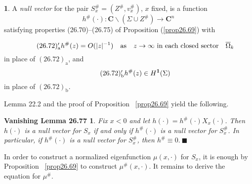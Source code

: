\documentclass{surv-l}
\theoremstyle{plain}
\newtheorem*{vlem}{\sc Vanishing Lemma 26.77}
\theoremstyle{definition}
\newtheorem{definition}[theorem]{\sc{Definition}}
\numberwithin{equation}{chapter}
\begin{document}
\renewcommand\thetheorem{26.\arabic{theorem}}
\setcounter{theorem}{75}
\begin{definition}\label{eq26.76}
A \emph{null vector} for the pair $S_{x}^{\#}=(Z^{\#}, v_{x}^{\#})$, $x$ fixed, is a function
\begin{equation*}
h^{\#}(\cdot):\mathbf{C}\backslash (\Sigma\cup Z^{\#})\rightarrow \mathbf{C}^{n}
\end{equation*}
satisfying properties (26.70)--(26.75) of Proposition (\ref{prop26.69}) with

\begin{equation*}
\tag*{$(26.72)'_{\mathrm{a}}$} h^{\#}(z)=O(|z|^{-1})\quad\mathrm{as}\quad  z\rightarrow\infty\text{ in each closed sector}\quad \overline{\Omega}_{k}
\end{equation*}
in place of $(26.72)_{\mathrm{a}}$, and
\begin{equation*}
\tag*{$(26.72)'_{\mathrm{b}}$} h^{\#}(z)\in H^\mathbf{1}(\Sigma)
\end{equation*}
in place of $(26.72)_{\mathrm{b}}$.

Lemma 22.2 and the proof of Proposition ~\ref{prop26.69} yield the following.
\end{definition}

\begin{vlem}\label{vlem26.77}
Fix $x<0$ and let $h(\cdot)=h^{\#}(\cdot)X_{x}(\cdot)$. Then $h(\cdot)$ is a null vector for $S_{x}$ if and only if $ h^{\#} (\cdot)$ is a null vector for $S_{x}^{\#}$. In particular, if $h^{\#}(\cdot)$ is a null vector for $ S_{x}^{\#}$, then $h^{\#}\equiv 0.\ \blacksquare$
\end{vlem}

In order to construct a normalized eigenfunction $\mu(x, \cdot)$ for $S_{x}$, it is enough by Proposition ~\ref{prop26.69} to construct $\mu^{\#}(x,\cdot)$. It remains to derive the equation for $\mu^{\#}$.
\end{document}
